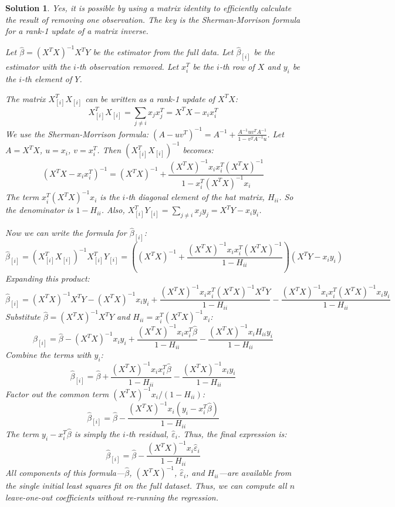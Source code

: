 \documentclass[12pt]{amsart}
\newtheorem*{solution}{Solution}
\begin{document}
\begin{solution}
Yes, it is possible by using a matrix identity to efficiently calculate the result of removing one observation. The key is the Sherman-Morrison formula for a rank-1 update of a matrix inverse.

Let $\hat{\beta} = (X^T X)^{-1}X^T Y$ be the estimator from the full data. Let $\hat{\beta}_{[i]}$ be the estimator with the $i$-th observation removed. Let $x_i^T$ be the $i$-th row of $X$ and $y_i$ be the $i$-th element of $Y$.

The matrix $X_{[i]}^T X_{[i]}$ can be written as a rank-1 update of $X^T X$:
$$ X_{[i]}^T X_{[i]} = \sum_{j \neq i} x_j x_j^T = X^T X - x_i x_i^T $$
We use the Sherman-Morrison formula: $(A - uv^T)^{-1} = A^{-1} + \frac{A^{-1}uv^T A^{-1}}{1 - v^T A^{-1}u}$.
Let $A = X^T X$, $u=x_i$, $v=x_i^T$. Then $(X_{[i]}^T X_{[i]})^{-1}$ becomes:
$$ (X^T X - x_i x_i^T)^{-1} = (X^T X)^{-1} + \frac{(X^T X)^{-1}x_i x_i^T (X^T X)^{-1}}{1 - x_i^T(X^T X)^{-1}x_i} $$
The term $x_i^T(X^T X)^{-1}x_i$ is the $i$-th diagonal element of the hat matrix, $H_{ii}$. So the denominator is $1-H_{ii}$.
Also, $X_{[i]}^T Y_{[i]} = \sum_{j \neq i} x_j y_j = X^T Y - x_i y_i$.

Now we can write the formula for $\hat{\beta}_{[i]}$:
$$ \hat{\beta}_{[i]} = (X_{[i]}^T X_{[i]})^{-1} X_{[i]}^T Y_{[i]} = \left((X^T X)^{-1} + \frac{(X^T X)^{-1}x_i x_i^T (X^T X)^{-1}}{1-H_{ii}}\right) (X^T Y - x_i y_i) $$
Expanding this product:
$$ \hat{\beta}_{[i]} = (X^T X)^{-1}X^T Y - (X^T X)^{-1}x_i y_i + \frac{(X^T X)^{-1}x_i x_i^T (X^T X)^{-1} X^T Y}{1-H_{ii}} - \frac{(X^T X)^{-1}x_i x_i^T (X^T X)^{-1} x_i y_i}{1-H_{ii}} $$
Substitute $\hat{\beta} = (X^T X)^{-1}X^T Y$ and $H_{ii} = x_i^T(X^T X)^{-1}x_i$:
$$ \hat{\beta}_{[i]} = \hat{\beta} - (X^T X)^{-1}x_i y_i + \frac{(X^T X)^{-1}x_i x_i^T \hat{\beta}}{1-H_{ii}} - \frac{(X^T X)^{-1}x_i H_{ii} y_i}{1-H_{ii}} $$
Combine the terms with $y_i$:
$$ \hat{\beta}_{[i]} = \hat{\beta} + \frac{(X^T X)^{-1}x_i x_i^T \hat{\beta}}{1-H_{ii}} - \frac{(X^T X)^{-1}x_i y_i}{1-H_{ii}} $$
Factor out the common term $(X^T X)^{-1}x_i / (1-H_{ii})$:
$$ \hat{\beta}_{[i]} = \hat{\beta} - \frac{(X^T X)^{-1}x_i (y_i - x_i^T\hat{\beta})}{1-H_{ii}} $$
The term $y_i - x_i^T\hat{\beta}$ is simply the $i$-th residual, $\hat{\varepsilon}_i$. Thus, the final expression is:
$$ \hat{\beta}_{[i]} = \hat{\beta} - \frac{(X^T X)^{-1}x_i \hat{\varepsilon}_i}{1-H_{ii}} $$
All components of this formula—$\hat{\beta}$, $(X^TX)^{-1}$, $\hat{\varepsilon}_i$, and $H_{ii}$—are available from the single initial least squares fit on the full dataset. Thus, we can compute all $n$ leave-one-out coefficients without re-running the regression.
\end{solution}
\end{document}
